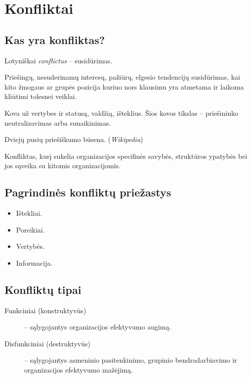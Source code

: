 \chapter{Konfliktai}

\section{Kas yra konfliktas?}

Lotyniškai \emph{conflictus} – susidūrimas.

\begin{defn}[Konfliktas]
  Priešingų, nesuderinamų interesų, pažiūrų, elgesio tendencijų
  susidūrimas, kai kito žmogaus ar grupės pozicija kuriuo nors
  klausimu yra atmetama ir laikoma kliūtimi tolesnei veiklai.
\end{defn}


\begin{defn}[Konfliktas]
  Kova už vertybes ir statusą, valdžią, išteklius. Šios kovos tikslas
  – priešininko neutralizavimas arba sunaikinimas.
\end{defn}

\begin{defn}[Konfliktas]
  Dviejų pusių priešiškumo būsena. (\emph{Wikipedia})
\end{defn}

\begin{defn}
  Konfliktas, kurį sukelia organizacijos specifinės savybės,
  struktūros ypatybės bei jos sąveika su kitomis organizacijomis.
\end{defn}

\section{Pagrindinės konfliktų priežastys}

\begin{itemize}
  \item Ištekliai.
  \item Poreikiai.
  \item Vertybės.
  \item Informacija.
\end{itemize}

\section{Konfliktų tipai}

\begin{description}
  \item[Funkciniai (konstruktyvūs)] – sąlygojantys organizacijos efektyvumo
    augimą.
  \item[Disfunkciniai (destruktyvūs)] – sąlygojantys asmeninio
    pasitenkinimo, grupinio bendradarbiavimo ir organizacijos efektyvumo
    mažėjimą.
\end{description}

